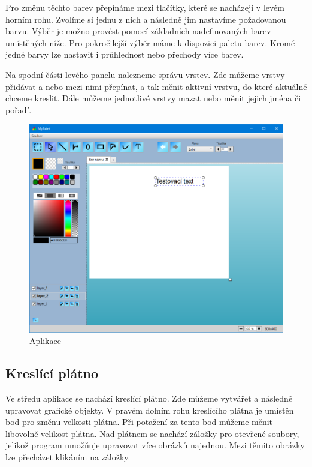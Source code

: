 \documentclass[
  field=inf,
  biblatex=false,
  glossaries,
  index
]{kidiplom}
\begin{document}
Pro změnu těchto barev přepínáme mezi tlačítky, které se nacházejí v  levém horním rohu. Zvolíme si jednu z nich a následně jim nastavíme požadovanou barvu. Výběr je možno provést pomocí základních nadefinovaných barev umístěných níže. Pro pokročilejší výběr máme k dispozici paletu barev. Kromě jedné barvy lze nastavit i průhlednost nebo přechody více barev.

Na spodní části levého panelu nalezneme správu vrstev. Zde můžeme vrstvy přidávat a nebo mezi nimi přepínat, a tak měnit aktivní vrstvu, do které aktuálně chceme kreslit. Dále můžeme jednotlivé vrstvy mazat nebo měnit jejich jména či pořadí.

\begin{figure}
\includegraphics[width=15cm]{img/program}
\caption{Aplikace}
\end{figure}  

\subsection{Kreslící plátno}

Ve středu aplikace se nachází kreslící plátno. Zde můžeme vytvářet a následně upravovat grafické objekty. V pravém dolním rohu kreslícího plátna je umístěn bod pro změnu velkosti plátna. Při potažení za tento bod můžeme měnit libovolně velikost plátna. Nad plátnem se nachází záložky pro otevřené soubory, jelikož program umožňuje upravovat více obrázků najednou. Mezi těmito obrázky lze přecházet klikáním na záložky.
\end{document}
